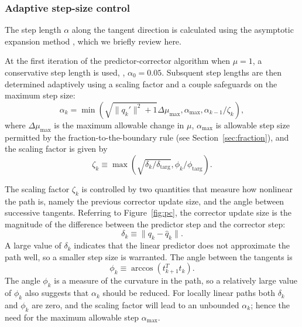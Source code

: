 \subsubsection{Adaptive step-size control}\label{sec:step}

The step length $\alpha$ along the tangent direction is calculated using the
asymptotic expansion method \cite{allgower3}, which we briefly review here.

At the first iteration of the predictor-corrector algorithm when $\mu=1$, a
conservative step length is used, \eg, $\alpha_0 = 0.05$.  Subsquent step
lengths are then determined adaptively using a scaling factor and a couple
safeguards on the maximum step size:
\begin{equation*}
  \alpha_{k} = \min\left( \sqrt{\|q_{k}'\|^2 + 1}\Delta \mu_{\max}, \alpha_{\max}, \alpha_{k-1}/\zeta_{k} \right),
\end{equation*}
where $\Delta \mu_{\max}$ is the maximum allowable change in $\mu$,
$\alpha_{\max}$ is allowable step size permitted by the fraction-to-the-boundary
rule (see Section~\ref{sec:fraction}), and the scaling factor is given by
\begin{equation*}
  \zeta_{k} \equiv \max\left( \sqrt{\delta_k/\delta_{\text{targ}}}, \phi_k / \phi_{\text{targ}} \right).
\end{equation*}

The scaling factor $\zeta_k$ is controlled by two quantities that measure how
nonlinear the path is, namely the previous corrector update size, and the angle
between successive tangents.  Referring to Figure~\ref{fig:pc}, the corrector
update size is the magnitude of the difference between the predictor step and
the corrector step:
\begin{equation}\label{eq:delta_k}
  \delta_k \equiv \| q_{k} - \hat{q}_{k} \|.
\end{equation}
A large value of $\delta_k$ indicates that the linear predictor does not
approximate the path well, so a smaller step size is warranted.  The angle
between the tangents is
\begin{equation}\label{eq:phi_k}
  \phi_k \equiv \arccos\left(t_{k+1}^T t_{k} \right).
\end{equation}
The angle $\phi_k$ is a measure of the curvature in the path, so a relatively
large value of $\phi_k$ also suggests that $\alpha_k$ should be reduced.  For
locally linear paths both $\delta_k$ and $\phi_k$ are zero, and the scaling
factor will lead to an unbounded $\alpha_k$; hence the need for the maximum
allowable step $\alpha_{\max}$.

